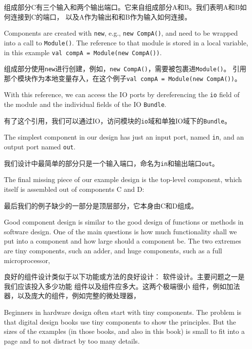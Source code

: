 \documentclass[%
    10pt,
    headinclude, footexclude,
    openright, %
    notitlepage,
    cleardoubleempty,
    headsepline,
    pointlessnumbers,
    bibtotoc, idxtotoc,
    ]{scrbook}
\newcommand{\code}[1]{{\small{\texttt{#1}}}}
\begin{document}
组成部分C有三个输入和两个输出端口。它来自组成部分A和B。我们表明A和B如何连接到C的端口，
以及A作为输出和和B作为输入如何连接。


Components are created with \code{new}, e.g., \code{new CompA()}, and need to be wrapped
into a call to \code{Module()}. The reference to that module is stored in a local variable,
in this example \code{val compA = Module(new CompA())}.

组成部分使用\code{new}进行创建，例如，\code{new CompA()}，需要被包裹进\code{Module()}。
引用那个模块作为本地变量存入，在这个例子\code{val compA = Module(new CompA())}。

With this reference, we can access the IO ports by dereferencing the \code{io} field of the module
and the individual fields of the IO \code{Bundle}.

有了这个引用，我们可以通过IO，访问模块的\code{io}域和单独IO域下的\code{Bundle}。

The simplest component in our design has just an input port, named \code{in}, and
an output port named \code{out}.

我们设计中最简单的部分只是一个输入端口，命名为\code{in}和输出端口\code{out}。


The final missing piece of our example design is the top-level component, which itself
is assembled out of components C and D:

最后我们的例子缺少的一部分是顶层部分，它本身由C和D组成。


Good component design is similar to the good design of functions or methods in
software design. One of the main questions is how much functionality shall we put into
a component and how large should a component be. The two extremes are tiny
components, such an adder, and huge components, such as a full microprocessor,

良好的组件设计类似于以下功能或方法的良好设计：
软件设计。主要问题之一是我们应该投入多少功能
组件以及组件应多大。这两个极端很小
组件，例如加法器，以及庞大的组件，例如完整的微处理器，

Beginners in hardware design often start with tiny components.
The problem is that digital design books use tiny components to show the principles.
But the sizes of the examples (in those books, and also in this book) is small
to fit into a page and to not distract by too many details.
\end{document}
